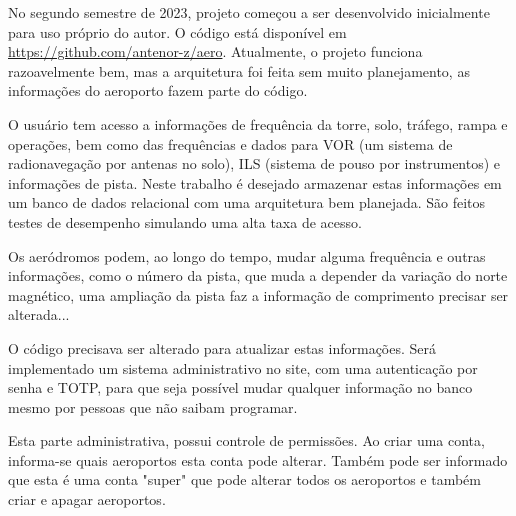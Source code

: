No segundo semestre de 2023, projeto começou a ser desenvolvido inicialmente para uso próprio do autor.
O código está disponível em \url{https://github.com/antenor-z/aero}. Atualmente, o
projeto funciona razoavelmente bem, mas a arquitetura foi feita sem muito planejamento, as
informações do aeroporto fazem parte do código.

O usuário tem acesso a informações de frequência da torre, solo, tráfego, rampa
e operações, bem como das frequências e dados para VOR (um sistema de radionavegação
por antenas no solo), ILS (sistema de pouso por instrumentos) e informações de 
pista. Neste trabalho é desejado armazenar estas informações em um banco de dados relacional com 
uma arquitetura bem planejada. São feitos testes de desempenho simulando uma alta taxa 
de acesso.

Os aeródromos podem, ao longo do tempo, mudar alguma frequência e outras
informações, como o número da pista, que muda a depender da variação do norte 
magnético, uma ampliação da pista faz a informação de comprimento precisar ser 
alterada...

O código precisava ser alterado para atualizar estas informações. Será implementado
 um sistema administrativo no site, com uma autenticação por senha e TOTP, para 
 que seja possível mudar qualquer informação no banco mesmo por pessoas que não 
 saibam programar.

Esta parte administrativa, possui controle de permissões. Ao criar uma conta, 
informa-se quais aeroportos esta conta pode alterar. Também pode ser informado que
  esta é uma conta "super" que pode alterar todos os aeroportos e também criar e 
  apagar aeroportos.
